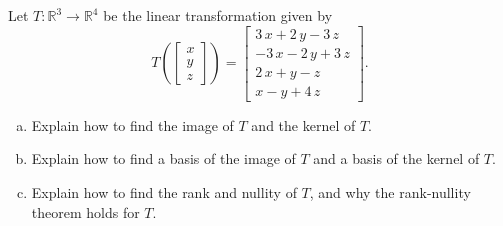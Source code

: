 
\begin{exerciseStatement}
 Let \(T:\mathbb{R}^ 3  \to \mathbb{R}^ 4 \) be the linear transformation given by \[T\left(  \left[\begin{array}{c}
x \\
y \\
z
\end{array}\right]  \right) =  \left[\begin{array}{c}
3 \, x + 2 \, y - 3 \, z \\
-3 \, x - 2 \, y + 3 \, z \\
2 \, x + y - z \\
x - y + 4 \, z
\end{array}\right] .\]
\begin{enumerate}[(a)]
\item Explain how to find the image of \(T\) and the kernel of \(T\).
\item Explain how to find a basis of the image of \(T\) and a basis of the kernel of \(T\).
\item Explain how to find the rank and nullity of \(T\), and why the rank-nullity theorem holds for \(T\).
\end{enumerate}
    
\end{exerciseStatement}
    

